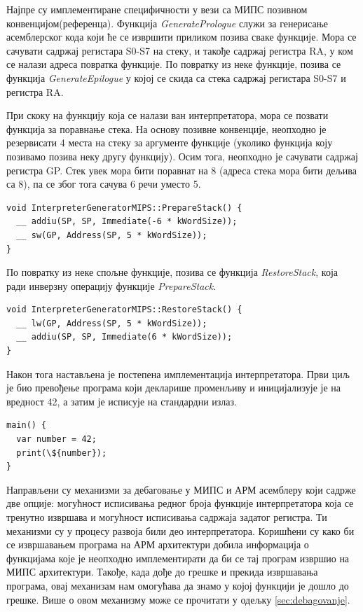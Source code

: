 \documentclass[12pt,oneside]{memoir}
\begin{document}
Најпре су имплементиране специфичности у вези са МИПС позивном конвенцијом(референца). Функција \textit{GeneratePrologue} служи за генерисање асемблерског кода који ће се извршити приликом позива сваке  функције. Мора се сачувати садржај регистара S0-S7 на стеку, и такође садржај регистра RA, у ком се налази адреса повратка функције. По повратку из неке функције, позива се функција \textit{GenerateEpilogue} у којој се скида са стека садржај регистара S0-S7 и регистра RA.

При скоку на функцију која се налази ван интерпретатора, мора се позвати функција за поравнање стека.
На основу позивне конвенције, неопходно је резервисати 4 места на стеку за аргументе функције (уколико функција коју позивамо позива неку другу функцију). Осим тога, неопходно је сачувати садржај регистра GP. Стек увек мора бити поравнат на 8 (адреса стека мора бити дељива са 8), па се због тога сачува 6 речи уместо 5.\\

\begin{verbatim}
void InterpreterGeneratorMIPS::PrepareStack() {
  __ addiu(SP, SP, Immediate(-6 * kWordSize));
  __ sw(GP, Address(SP, 5 * kWordSize));
}
\end{verbatim}

По повратку из неке спољне функције, позива се функција \textit{RestoreStack}, која ради инверзну операцију функције \textit{PrepareStack}.\\

\begin{verbatim}
void InterpreterGeneratorMIPS::RestoreStack() {
  __ lw(GP, Address(SP, 5 * kWordSize));
  __ addiu(SP, SP, Immediate(6 * kWordSize));
}
\end{verbatim}

Након тога настављена је постепена имплементација интерпретатора. Први циљ је био превођење програма који декларише променљиву и иницијализује је на вредност 42, а затим је исписује на стандардни излаз.\\

\begin{verbatim}
main() {
  var number = 42;
  print(\${number});
}
\end{verbatim}

Направљени су механизми за дебаговање у МИПС и АРМ асемблеру који садрже две опције: могућност исписивања редног броја функције интерпретатора која се тренутно извршава и могућност исписивања садржаја задатог регистра. Ти механизми су у процесу развоја били део интерпретатора. Коришћени су како би се извршавањем програма на АРМ архитектури добила информација о функцијама које је неопходно имплементирати да би се тај програм извршио на МИПС архитектури. Такође, када дође до грешке и прекида извршавања програма, овај механизам нам омогућава да знамо у којој функцији је дошло до грешке. Више о овом механизму може се прочитати у одељку \ref{sec:debagovanje}.
\end{document}
